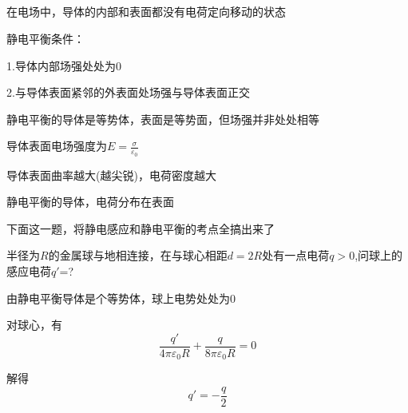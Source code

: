 \documentclass[lang=cn,10pt]{elegantbook}
\begin{document}
		\subsection{\color{red} }
		\begin{definition}[静电平衡]
			在电场中，导体的内部和表面都没有电荷定向移动的状态
		\end{definition}
		\begin{note}
			静电平衡条件：
			
			1.导体内部场强处处为0
			
			2.与导体表面紧邻的外表面处场强与导体表面正交
		\end{note}
		\begin{remark}
			静电平衡的导体是等势体，表面是等势面，但场强并非处处相等
		\end{remark}
		\begin{remark}
			导体表面电场强度为$E=\frac{\sigma}{\varepsilon_{0}}$
		\end{remark}
		\begin{remark}
			导体表面曲率越大(越尖锐)，电荷密度越大
		\end{remark}
		\begin{remark}
			静电平衡的导体，电荷分布在表面
		\end{remark}
		下面这一题，将静电感应和静电平衡的考点全搞出来了
		\begin{example}
			半径为$R$的金属球与地相连接，在与球心相距$d=2R$处有一点电荷$q>0$,问球上的感应电荷$q'$=?
		\end{example}
		\begin{solution}
			由静电平衡导体是个等势体，球上电势处处为0
			
			对球心，有
			\begin{equation*}
				\frac{q'}{4\pi \varepsilon _0R}+\frac{q}{8\pi \varepsilon _0R}=0
			\end{equation*}
			
			解得
			\begin{equation*}
				q'=-\frac{q}{2}
			\end{equation*}
		\end{solution}
\end{document}

